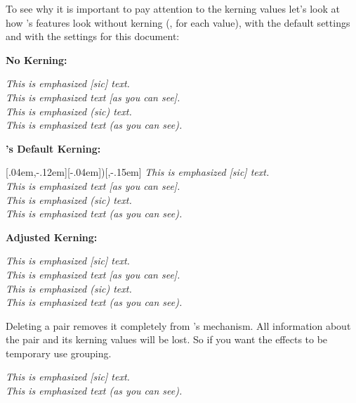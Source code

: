 \documentclass[DIV10,toc=index,toc=bib]{cnpkgdoc}
\begin{document}
To see why it is important to pay attention to the kerning values let's look at
how \embrac's features look without kerning (\ie, \code{0pt} for each value),
with the default settings and with the settings for this document:

\begin{center}
 \begin{minipage}{.5\linewidth}
  \textbf{No Kerning:}
  
  \RenewEmph{[}{]}\RenewEmph{(}{)}
  \emph{This is emphasized [sic] text.} \\
  \emph{This is emphasized text [as you can see].} \\
  \emph{This is emphasized (sic) text.} \\
  \emph{This is emphasized text (as you can see).}
 \end{minipage}\bigskip
 
 \begin{minipage}{.5\linewidth}
  \textbf{\embrac's Default Kerning:}
  
  \RenewEmph{[}{]}[.04em,-.12em]\RenewEmph{(}[-.04em]{)}[,-.15em]
  \emph{This is emphasized [sic] text.} \\
  \emph{This is emphasized text [as you can see].} \\
  \emph{This is emphasized (sic) text.} \\
  \emph{This is emphasized text (as you can see).}
 \end{minipage}\bigskip
 
 \begin{minipage}{.5\linewidth}
  \textbf{Adjusted Kerning:}
  
  \emph{This is emphasized [sic] text.} \\
  \emph{This is emphasized text [as you can see].} \\
  \emph{This is emphasized (sic) text.} \\
  \emph{This is emphasized text (as you can see).}
 \end{minipage}
\end{center}

Deleting a pair removes it completely from \embrac's mechanism. All information
about the pair and its kerning values will be lost. So if you want the effects
to be temporary use grouping.
\begin{beispiel}
 \DeleteEmph[]
 \emph{This is emphasized [sic] text.} \\
 \emph{This is emphasized text (as you can see).}
\end{beispiel}
\end{document}

